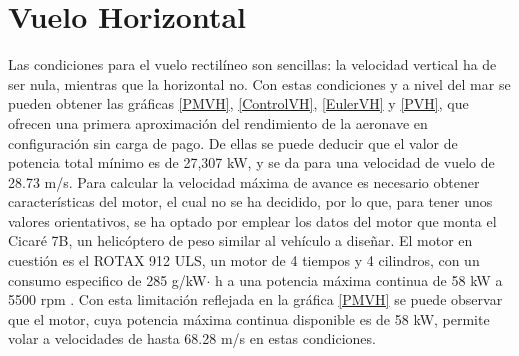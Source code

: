 \chapter{Vuelo Horizontal}

Las condiciones para el vuelo rectilíneo son sencillas: la velocidad vertical ha de ser nula, mientras que la horizontal no. Con estas condiciones y a nivel del mar se pueden obtener las gráficas \ref{PMVH}, \ref{ControlVH}, \ref{EulerVH} y \ref{PVH}, que ofrecen una primera aproximación del rendimiento de la aeronave en configuración sin carga de pago. De ellas se puede deducir que el valor de potencia total mínimo es de 27,307 kW, y se da para una velocidad de vuelo de 28.73 m/s. Para calcular la velocidad máxima de avance es necesario obtener características del motor, el cual no se ha decidido, por lo que, para tener unos valores orientativos, se ha optado por emplear los datos del motor que monta el Cicaré 7B, un helicóptero de peso similar al vehículo a diseñar. El motor en cuestión es el ROTAX 912 ULS, un motor de 4 tiempos y 4 cilindros, con un consumo especifico de 285 g/kW$\cdot$ h a una potencia máxima continua de 58 kW a 5500 rpm \citep{ROTAX}. Con esta limitación reflejada en la gráfica \ref{PMVH} se puede observar que el motor, cuya potencia máxima continua disponible es de 58 kW, permite volar a velocidades de hasta 68.28 m/s en estas condiciones.

